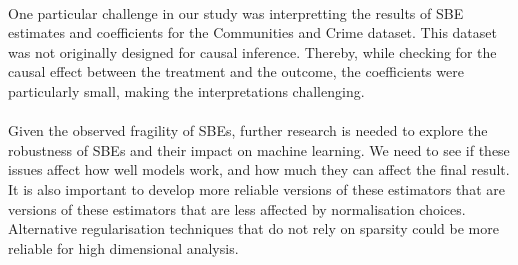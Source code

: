 \\
One particular challenge in our study was interpretting the results of SBE estimates and coefficients for the Communities and Crime dataset. This dataset was not originally designed for causal inference. Thereby, while checking for the causal effect between the treatment and the outcome, the coefficients were particularly small, making the interpretations challenging.\\
\\
Given the observed fragility of SBEs, further research is needed to explore the robustness of SBEs and their impact on machine learning. We need to see if these issues affect how well models work, and how much they can affect the final result. It is also important to develop more reliable versions of these estimators that are versions of these estimators that are less affected by normalisation choices. Alternative regularisation techniques that do not rely on sparsity could be more reliable for high dimensional analysis.
